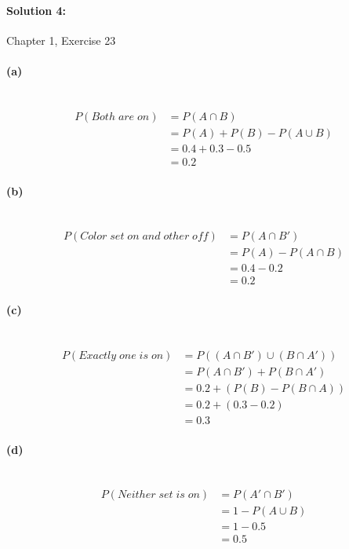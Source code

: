 \documentclass[a4paper]{article}
\begin{document}
\paragraph{Solution 4:}
Chapter 1, Exercise 23

\paragraph{(a)} ~\\
\begin{align*}
P(Both \; are \; on) &= P(A \cap B) \\
               &= P(A) + P(B) - P(A \cup B) \\
               &= 0.4 + 0.3 - 0.5 \\
               &= 0.2
\end{align*}

\paragraph{(b)} ~\\
\begin{align*}
P(Color \; set \; on \; and \; other \; off) &= P(A \cap B') \\
                           &= P(A) - P(A \cap B) \\
                           &= 0.4 - 0.2 \\
                           &= 0.2
\end{align*}

\paragraph{(c)} ~\\
\begin{align*}
P(Exactly \; one \; is \; on) &= P((A \cap B') \cup (B \cap A'))  \\
                    &= P(A \cap B') + P(B \cap A') \\
                    &= 0.2 + (P(B) - P(B \cap A)) \\
                    &= 0.2 + (0.3 - 0.2) \\
                    &= 0.3
\end{align*}

\paragraph{(d)} ~\\
\begin{align*}
P(Neither \; set \; is \; on) &= P(A' \cap B') \\
                    &= 1 - P(A \cup B) \\
                    &= 1 - 0.5 \\
                    &= 0.5
\end{align*}
\end{document}
